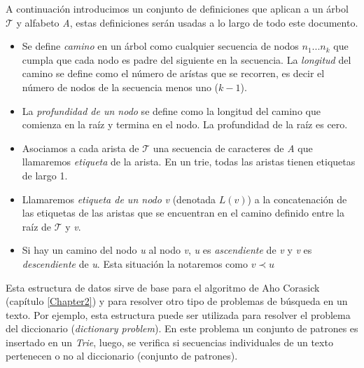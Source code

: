 \myrule{}{}
A continuación introducimos un conjunto de definiciones que aplican a un árbol $\mathcal{T}$ y alfabeto {\it A}, estas definiciones serán usadas a lo largo de todo este documento.
\begin{itemize}
\item Se define \emph{camino} en un árbol como cualquier secuencia de nodos $n_{1}...n_{k}$ que cumpla que cada nodo es padre del siguiente en la secuencia. La \emph{longitud} del camino se define como el número de arístas que se recorren, es decir el número de nodos de la secuencia menos uno ($k - 1$).
\item La \emph{profundidad de un nodo} se define como la longitud del camino que comienza en la raíz y termina en el nodo. La profundidad de la raíz es cero.
\item Asociamos a cada arista de $\mathcal{T}$ una secuencia de caracteres de {\it A} que llamaremos \emph{etiqueta} de la arista. En un trie, todas las aristas tienen etiquetas de largo 1.
\item Llamaremos \emph{etiqueta de un nodo} {\it v} (denotada $L(v)$) a la concatenación de las etiquetas de las aristas que se encuentran en el camino definido entre la raíz de $\mathcal{T}$ y {\it v}.
\item Si hay un camino del nodo {\it u} al nodo {\it v}, {\it u} es \emph{ascendiente} de {\it v} y {\it v} es \emph{descendiente} de {\it u}. Esta situación la notaremos como $v \prec u$
\end{itemize}
Esta estructura de datos sirve de base para el algoritmo de Aho Corasick (capítulo \ref{Chapter2}) y para resolver otro tipo de problemas de búsqueda en un texto. Por ejemplo, esta estructura puede ser utilizada para resolver el problema del diccionario ({\it dictionary problem}). En este problema un conjunto de patrones es insertado en un {\it Trie}, luego, se verifica si secuencias individuales de un texto pertenecen o no al diccionario (conjunto de patrones).
